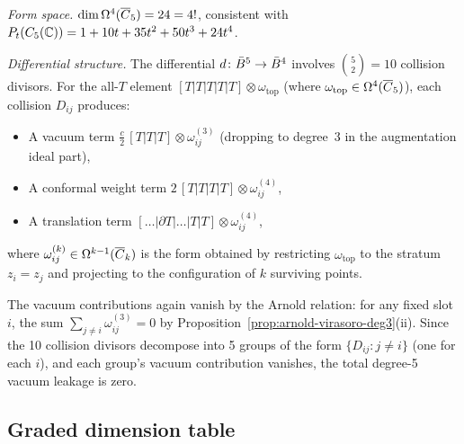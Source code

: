 \begin{computation}
\label{comp:virasoro-deg5}

\emph{Form space.}
$\dim \Omega^4(\overline{C}_5) = 24 = 4!$, consistent with
$P_t(C_5(\mathbb{C})) = 1 + 10t + 35t^2 + 50t^3 + 24t^4$.

\emph{Differential structure.}
The differential $d\colon \bar{B}^5 \to \bar{B}^4$ involves $\binom{5}{2} = 10$
collision divisors.  For the all-$T$ element
$[T|T|T|T|T] \otimes \omega_{\mathrm{top}}$
(where $\omega_{\mathrm{top}} \in \Omega^4(\overline{C}_5)$),
each collision $D_{ij}$ produces:
\begin{itemize}
\item A vacuum term $\frac{c}{2}\,[T|T|T] \otimes \omega^{(3)}_{ij}$
  (dropping to degree~3 in the augmentation ideal part),
\item A conformal weight term
  $2\,[T|T|T|T] \otimes \omega^{(4)}_{ij}$,
\item A translation term
  $[\ldots|\partial T|\ldots|T|T] \otimes \omega^{(4)}_{ij}$,
\end{itemize}
where $\omega^{(k)}_{ij} \in \Omega^{k-1}(\overline{C}_k)$ is the
form obtained by restricting $\omega_{\mathrm{top}}$ to the stratum
$z_i = z_j$ and projecting to the configuration of $k$ surviving points.

The vacuum contributions again vanish by the Arnold relation:
for any fixed slot $i$, the sum $\sum_{j \neq i} \omega^{(3)}_{ij} = 0$
by Proposition~\ref{prop:arnold-virasoro-deg3}(ii).
Since the 10 collision divisors decompose into 5 groups of the form
$\{D_{ij} : j \neq i\}$ (one for each $i$), and each group's vacuum
contribution vanishes, the total degree-5 vacuum leakage is zero.
\end{computation}

\subsection{Graded dimension table}


